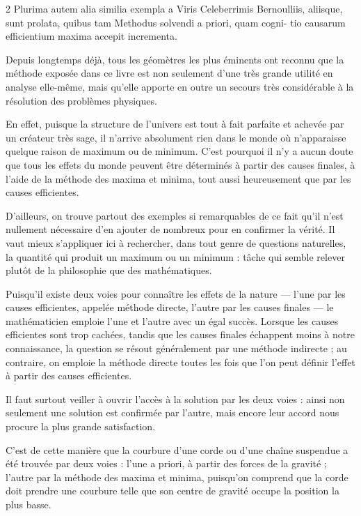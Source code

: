 \documentclass[a4paper,10pt]{article}
\begin{document}
\begin{multicols}{2}
Plurima autem alia similia exempla a Viris Celeberrimis Bernoulliis, aliisque, sunt prolata, quibus tam Methodus solvendi a priori, quam cogni-
tio causarum efficientium maxima accepit incrementa.

\columnbreak
Depuis longtemps déjà, tous les géomètres les plus éminents ont reconnu que la méthode exposée dans ce livre est non seulement d’une très grande utilité en analyse elle-même, mais qu’elle apporte en outre un secours très considérable à la résolution des problèmes physiques.

En effet, puisque la structure de l’univers est tout à fait parfaite et achevée par un créateur très sage, il n’arrive absolument rien dans le monde où n’apparaisse quelque raison de maximum ou de minimum. C’est pourquoi il n’y a aucun doute que tous les effets du monde peuvent être déterminés à partir des causes finales, à l’aide de la méthode des maxima et minima, tout aussi heureusement que par les causes efficientes.

D’ailleurs, on trouve partout des exemples si remarquables de ce fait qu’il n’est nullement nécessaire d’en ajouter de nombreux pour en confirmer la vérité. Il vaut mieux s’appliquer ici à rechercher, dans tout genre de questions naturelles, la quantité qui produit un maximum ou un minimum : tâche qui semble relever plutôt de la philosophie que des mathématiques.

Puisqu’il existe deux voies pour connaître les effets de la nature — l’une par les causes efficientes, appelée méthode directe, l’autre par les causes finales — le mathématicien emploie l’une et l’autre avec un égal succès. Lorsque les causes efficientes sont trop cachées, tandis que les causes finales échappent moins à notre connaissance, la question se résout généralement par une méthode indirecte ; au contraire, on emploie la méthode directe toutes les fois que l’on peut définir l’effet à partir des causes efficientes.

Il faut surtout veiller à ouvrir l’accès à la solution par les deux voies : ainsi non seulement une solution est confirmée par l’autre, mais encore leur accord nous procure la plus grande satisfaction.

C’est de cette manière que la courbure d’une corde ou d’une chaîne suspendue a été trouvée par deux voies : l’une a priori, à partir des forces de la gravité ; l’autre par la méthode des maxima et minima, puisqu’on comprend que la corde doit prendre une courbure telle que son centre de gravité occupe la position la plus basse.


\end{multicols}
\end{document}

